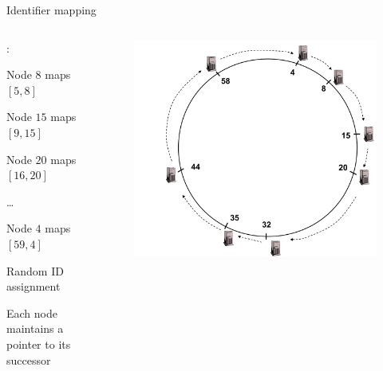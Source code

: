 \begin{frame}{Identifier mapping}

\begin{columns}
\begin{column}{0.4\textwidth}
:
\BI
\item Node  $8$ maps $[5,8]$
\item Node $15$ maps $[9,15]$
\item Node $20$ maps $[16, 20]$
\item \ldots
\item Node $4$ maps $[59, 4]$
\EI

\bigskip
\BI
\item Random ID assignment
\item Each node maintains a pointer to its successor
\EI
\end{column}
\begin{column}{0.6\textwidth}
\begin{figure}
\includegraphics[width=1.0\textwidth]{chord-example2}
\end{figure}
\end{column}
\end{columns}

\end{frame}

